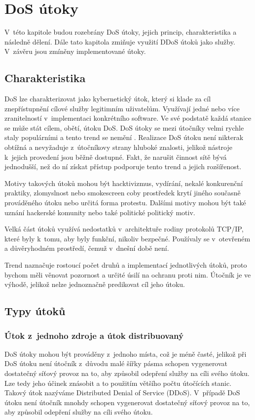 \chapter[DoS útoky]{DoS útoky}
V~této kapitole budou rozebrány DoS útoky, jejich princip, charakteristika a následně
dělení. Dále tato kapitola zmiňuje využití DDoS útoků jako služby. V~závěru jsou
zmíněny implementované útoky.

\section{Charakteristika}
DoS lze charakterizovat jako kybernetický útok, který si klade za cíl znepřístupnění
 cílové služby legitimním uživatelům. Využívají jedné nebo více zranitelností v~implementaci
 konkrétního software. Ve své podstatě každá stanice se může stát cílem, obětí, útoku
 DoS. DoS útoky se mezi útočníky velmi rychle staly populárními a tento trend
 se nemění \cite{akamai_q2_2017}. Realizace DoS útoku není nikterak obtížná a
 nevyžaduje z~útočníkovy strany hluboké znalosti, jelikož nástroje k~jejich provedení jsou
 běžně dostupné. %
 Fakt, že narušit činnost sítě bývá
 jednodušší, než do ní získat přístup podporuje tento trend a jejich rozšířenost. 

Motivy takových útoků mohou být hacktivizmus, vydírání, nekalé konkurenční praktiky,
zlomyslnost nebo smokescreen coby prostředek krytí jiného současně prováděného útoku nebo
určitá forma protestu. Dalšími motivy mohou být také uznání hackerské komunity nebo také
politické politický motiv.

Velká část útoků využívá nedostatků v~architektuře rodiny protokolů TCP/IP, které byly k~tomu,
aby byly funkční, nikoliv bezpečné. Používaly se v~otevřeném a důvěryhodném prostředí, čemuž
v~dnešní době není.

Trend naznačuje rostoucí počet druhů a implementací jednotlivých útoků, proto bychom měli
věnovat pozornost a určité úsilí na ochranu proti nim. Útočník je ve výhodě, jelikož nelze
jednoznačně predikovat cíl jeho útoku.


\section{Typy útoků}
\subsection{Útok z~jednoho zdroje a útok distribuovaný}
\label{subs_ddos}
DoS útoky mohou být prováděny z~jednoho místa, což je méně časté, jelikož při
DoS útoku není útočník z~důvodu malé šířky pásma schopen vygenerovat dostatečný síťový
provoz na to, aby způsobil odepření služby na cíli svého útoku. Lze tedy jeho účinek znásobit a
to použitím většího počtu útočících stanic. Takový útok nazýváme Distributed Denial of Service (DDoS). V~případě
DoS útoku není útočník mnohdy schopen vygenerovat dostatečný síťový provoz na to, aby
způsobil odepření služby na cíli svého útoku.


